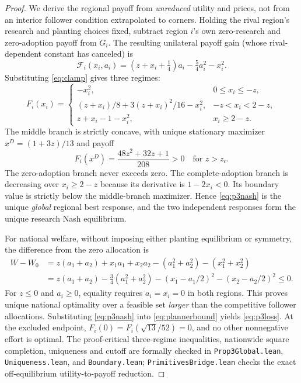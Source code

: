 \documentclass[11pt]{article}
\begin{document}
\begin{proof}
We derive the regional payoff from \emph{unreduced} utility and prices, not from an interior follower condition extrapolated to corners. Holding the rival region's research and planting choices fixed, subtract region $i$'s own zero-research and zero-adoption payoff from $G_i$. The resulting unilateral payoff gain (whose rival-dependent constant has canceled) is
\begin{equation}
 \mathcal F_i(x_i,a_i)
 =(z+x_i+\tfrac14)a_i-\tfrac54a_i^2-x_i^2.
 \label{eq:offpathpayoff}
\end{equation}
Substituting \eqref{eq:clamp} gives three regimes:
\begin{equation}
 F_i(x_i)=
 \begin{cases}
 -x_i^2,&0\leq x_i\leq-z,\\[2pt]
 (z+x_i)/8+3(z+x_i)^2/16-x_i^2,&-z<x_i<2-z,\\[2pt]
 z+x_i-1-x_i^2,&x_i\geq2-z.
 \end{cases}
 \label{eq:threebranches}
\end{equation}
The middle branch is strictly concave, with unique stationary maximizer $x^D=(1+3z)/13$ and payoff
\[
 F_i(x^D)=\frac{48z^2+32z+1}{208}>0
 \quad\text{for }z>z_c.
\]
The zero-adoption branch never exceeds zero. The complete-adoption branch is decreasing over $x_i\geq2-z$ because its derivative is $1-2x_i<0$. Its boundary value is strictly below the middle-branch maximizer. Hence \eqref{eq:p3nash} is the unique \emph{global} regional best response, and the two independent responses form the unique research Nash equilibrium.

For national welfare, without imposing either planting equilibrium or symmetry, the difference from the zero allocation is
\begin{align}
 W-W_0
 &=z(a_1+a_2)+x_1a_1+x_2a_2
   -(a_1^2+a_2^2)-(x_1^2+x_2^2)\nonumber\\
 &=z(a_1+a_2)-\frac34(a_1^2+a_2^2)
   -(x_1-a_1/2)^2-(x_2-a_2/2)^2
 \leq0.
 \label{eq:plannerbound}
\end{align}
For $z\leq0$ and $a_i\geq0$, equality requires $a_i=x_i=0$ in both regions. This proves unique national optimality over a feasible set \emph{larger} than the competitive follower allocations. Substituting \eqref{eq:p3nash} into \eqref{eq:plannerbound} yields \eqref{eq:p3loss}. At the excluded endpoint, $F_i(0)=F_i(\sqrt{13}/52)=0$, and no other nonnegative effort is optimal. The proof-critical three-regime inequalities, nationwide square completion, uniqueness and cutoff are formally checked in \texttt{Prop3Global.lean}, \texttt{Uniqueness.lean}, and \texttt{Boundary.lean}; \texttt{PrimitivesBridge.lean} checks the exact off-equilibrium utility-to-payoff reduction.
\end{proof}
\end{document}
